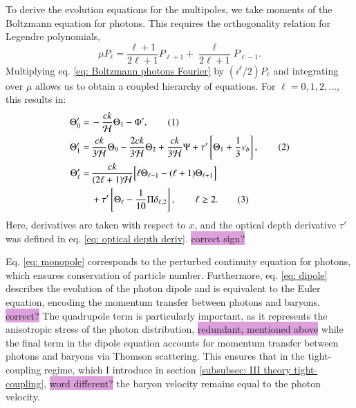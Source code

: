 \documentclass{aa}
\newcommand\numberthis{\addtocounter{equation}{1}\tag{\theequation}}
\numberwithin{equation}{section}
\numberwithin{table}{section}
\numberwithin{figure}{section}
\begin{document}
To derive the evolution equations for the multipoles, we take moments of the Boltzmann equation for photons. This requires the orthogonality relation for Legendre polynomials,
\begin{equation}
  \mu P_\ell = \frac{\ell+1}{2\ell+1} P_{\ell+1} + \frac{\ell}{2\ell+1} P_{\ell-1}. 
\end{equation}
Multiplying eq. \eqref{eq: Boltzmann photons Fourier} by $(i^\ell/2) P_\ell$ and integrating over $\mu$ allows us to obtain a coupled hierarchy of equations. For $\ell = 0,1,2,\ldots$, this results in:
\begin{align*} 
  \Theta_0' =\, &-\frac{ck}{\mathcal{H}} \Theta_1 - \Phi', \numberthis \label{eq: monopole} \\ 
  \Theta_1' =\, &\frac{ck}{3\mathcal{H}} \Theta_0 - \frac{2ck}{3\mathcal{H}} \Theta_2 + \frac{ck}{3\mathcal{H}} \Psi + \tau' \left[ \Theta_1 + \frac{1}{3} v_b \right], \numberthis \label{eq: dipole} \\
  \Theta_\ell' =\, &\frac{c k}{(2\ell+1) \mathcal{H}} \Big[ \ell \Theta_{\ell-1} - (\ell+1) \Theta_{\ell+1} \Big] \\
  &+ \tau' \left[ \Theta_\ell - \frac{1}{10} \Pi \delta_{\ell,2} \right], \qquad \ell \geq 2. \numberthis 
\end{align*}
Here, derivatives are taken with respect to $x$, and the optical depth derivative $\tau'$ was defined in eq. \eqref{eq: optical depth deriv}. \colorbox{Plum}{correct sign?} 

Eq. \eqref{eq: monopole} corresponds to the perturbed continuity equation for photons, which ensures conservation of particle number. Furthermore, eq. \eqref{eq: dipole} describes the evolution of the photon dipole and is equivalent to the Euler equation, encoding the momentum transfer between photons and baryons. \colorbox{Plum}{correct?} The quadrupole term is particularly important, as it represents the anisotropic stress of the photon distribution, \colorbox{Plum}{redundant, mentioned above} while the final term in the dipole equation accounts for momentum transfer between photons and baryons via Thomson scattering. This ensures that in the tight-coupling regime, which I introduce in section \ref{subsubsec: III theory tight-coupling}, \colorbox{Plum}{word different?} the baryon velocity remains equal to the photon velocity.
\end{document}

